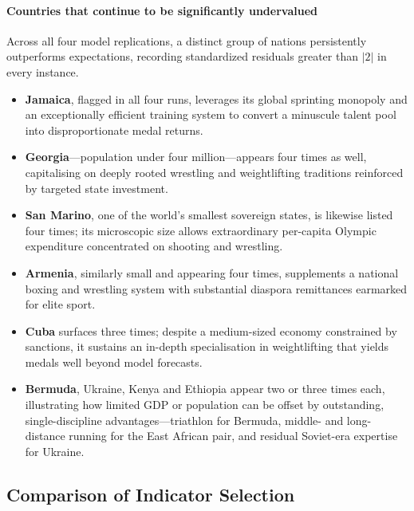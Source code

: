 \documentclass[11pt,twoside]{article}
\numberwithin{Theorem}{section}
\numberwithin{Definition}{section}
\numberwithin{Lemma}{section}
\numberwithin{Algorithm}{section}
\numberwithin{equation}{section}
\begin{document}
\paragraph{Countries that continue to be significantly undervalued}
Across all four model replications, a distinct group of nations persistently outperforms expectations, recording standardized residuals greater than $|2|$ in every instance. 

\begin{itemize}
    \item \textbf{Jamaica}, flagged in all four runs, leverages its global sprinting monopoly and an exceptionally efficient training system to convert a minuscule talent pool into disproportionate medal returns. 
    
    \item \textbf{Georgia}---population under four million---appears four times as well, capitalising on deeply rooted wrestling and weightlifting traditions reinforced by targeted state investment. 
    
    \item \textbf{San Marino}, one of the world's smallest sovereign states, is likewise listed four times; its microscopic size allows extraordinary per-capita Olympic expenditure concentrated on shooting and wrestling. 
    
    \item \textbf{Armenia}, similarly small and appearing four times, supplements a national boxing and wrestling system with substantial diaspora remittances earmarked for elite sport. 
    
    \item \textbf{Cuba} surfaces three times; despite a medium-sized economy constrained by sanctions, it sustains an in-depth specialisation in weightlifting that yields medals well beyond model forecasts. 
    
    \item \textbf{Bermuda}, Ukraine, Kenya and Ethiopia appear two or three times each, illustrating how limited GDP or population can be offset by outstanding, single-discipline advantages---triathlon for Bermuda, middle- and long-distance running for the East African pair, and residual Soviet-era expertise for Ukraine.
\end{itemize}

\subsection{Comparison of Indicator Selection}
\label{subsec:indicator_comparison}
\end{document}

